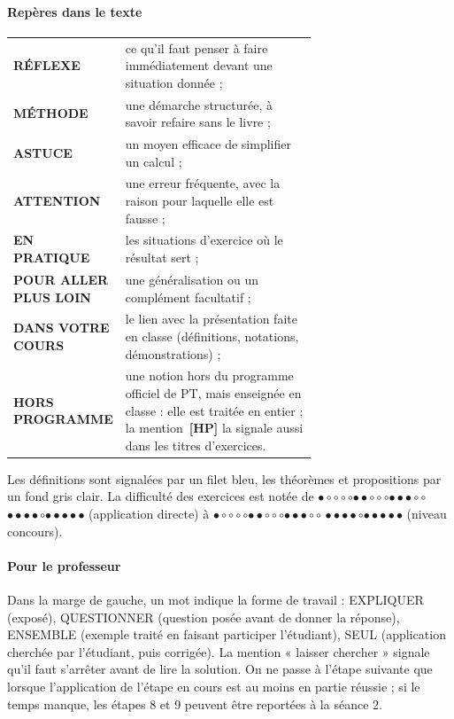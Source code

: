 \documentclass[a4paper,11pt]{article}
\numberwithin{equation}{section}
\numberwithin{figure}{section}
\numberwithin{table}{section}
\theoremstyle{enonce}
\theoremstyle{exemple}
\theoremstyle{remarque}
\newcommand{\niveau}[1]{{\color{Ocre}\footnotesize
  \ifcase#1\or$\bullet\circ\circ\circ\circ$\or$\bullet\bullet\circ\circ\circ$\or$\bullet\bullet\bullet\circ\circ$%
  \or$\bullet\bullet\bullet\bullet\circ$\or$\bullet\bullet\bullet\bullet\bullet$\fi}}
\newcommand{\HP}{\,{\sffamily\bfseries\scriptsize\textcolor{Brique}{[HP]}}}
\begin{document}
\paragraph{Repères dans le texte}
\begin{center}
\renewcommand{\arraystretch}{1.3}
\begin{tabular}{>{\sffamily\bfseries\footnotesize}l p{0.68\linewidth}}
\color{Bleu}RÉFLEXE & ce qu'il faut penser à faire immédiatement devant une situation donnée ;\\
\color{Bleu}\colorbox{Bleu}{\color{white}MÉTHODE} & une démarche structurée, à savoir refaire sans le livre ;\\
\color{Ocre}ASTUCE & un moyen efficace de simplifier un calcul ;\\
\color{Brique}ATTENTION & une erreur fréquente, avec la raison pour laquelle elle est fausse ;\\
\color{BleuMoyen}EN PRATIQUE & les situations d'exercice où le résultat sert ;\\
\color{Gris}POUR ALLER PLUS LOIN & une généralisation ou un complément facultatif ;\\
\color{Ocre}DANS VOTRE COURS & le lien avec la présentation faite en classe (définitions, notations, démonstrations) ;\\
\color{Brique}HORS PROGRAMME & une notion hors du programme officiel de PT, mais enseignée en classe : elle est traitée en entier ; la mention \HP{} la signale aussi dans les titres d'exercices.\\
\end{tabular}
\end{center}
Les définitions sont signalées par un filet bleu, les théorèmes et propositions par un fond gris clair. La difficulté
des exercices est notée de \niveau{1} (application directe) à \niveau{5} (niveau concours).

\paragraph{Pour le professeur} Dans la marge de gauche, un mot indique la forme de travail :
\textsf{\small\color{Gris}EXPLIQUER} (exposé), \textsf{\small\color{Gris}QUESTIONNER} (question posée avant de donner la
réponse), \textsf{\small\color{Gris}ENSEMBLE} (exemple traité en faisant participer l'étudiant), \textsf{\small\color{Gris}SEUL}
(application cherchée par l'étudiant, puis corrigée). La mention « laisser chercher » signale qu'il faut s'arrêter avant
de lire la solution. On ne passe à l'étape suivante que lorsque l'application de l'étape en cours est au moins en partie
réussie ; si le temps manque, les étapes 8 et 9 peuvent être reportées à la séance 2.
\end{document}
